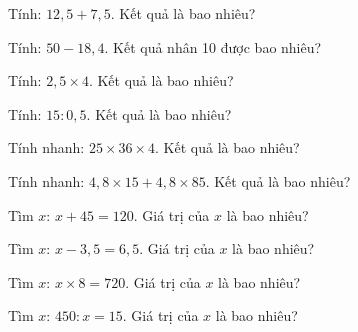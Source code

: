 \begin{ex}
  Tính: $12{,}5 + 7{,}5$. Kết quả là bao nhiêu?
\end{ex}

\begin{ex}
  Tính: $50 - 18{,}4$. Kết quả nhân 10 được bao nhiêu?
\end{ex}

\begin{ex}
  Tính: $2{,}5 \times 4$. Kết quả là bao nhiêu?
\end{ex}

\begin{ex}
  Tính: $15 : 0{,}5$. Kết quả là bao nhiêu?
\end{ex}

\begin{ex}
  Tính nhanh: $25 \times 36 \times 4$. Kết quả là bao nhiêu?
\end{ex}

\begin{ex}
  Tính nhanh: $4{,}8 \times 15 + 4{,}8 \times 85$. Kết quả là bao nhiêu?
\end{ex}

\begin{ex}
  Tìm $x$: $x + 45 = 120$. Giá trị của $x$ là bao nhiêu?
\end{ex}

\begin{ex}
  Tìm $x$: $x - 3{,}5 = 6{,}5$. Giá trị của $x$ là bao nhiêu?
\end{ex}

\begin{ex}
  Tìm $x$: $x \times 8 = 720$. Giá trị của $x$ là bao nhiêu?
\end{ex}

\begin{ex}
  Tìm $x$: $450 : x = 15$. Giá trị của $x$ là bao nhiêu?
\end{ex}

